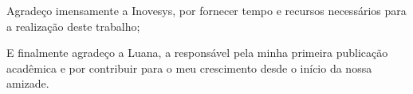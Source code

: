 \documentclass[a4paper,12pt]{report}
\begin{document}
Agradeço imensamente a Inovesys, por fornecer tempo e recursos necessários para a realização deste trabalho;

E finalmente agradeço a Luana, a responsável pela minha primeira publicação acadêmica e por contribuir para o meu crescimento desde o início da nossa amizade.



\def\us{\char`\_}

\thispagestyle{fancy}
\tableofcontents
\thispagestyle{fancy}
\listoffigures
{}
\thispagestyle{fancy}
\listoflistings
{}
\thispagestyle{fancy}
\thispagestyle{fancy}
\printglossaries


\doublespacing






\clearpage
{}


\end{document}
